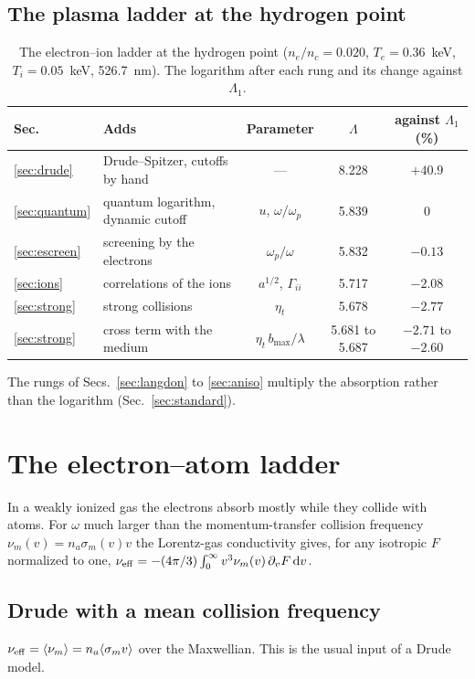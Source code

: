\documentclass[11pt]{article}
\numberwithin{equation}{section}
\newcommand{\dd}{\mathrm d}
\newcommand{\nueff}{\nu_{\rm eff}}
\begin{document}
\subsection{The plasma ladder at the hydrogen point}
\label{sec:hpoint}

\begin{table}[ht]
\caption{The electron--ion ladder at the hydrogen point ($n_e/n_c=0.020$, $T_e=0.36$~keV,
$T_i=0.05$~keV, 526.7~nm). The logarithm after each rung and its change against $\Lambda_1$.}
\label{tab:plasma}
\begin{center}
\begin{tabular}{lL{4.6cm}ccc}
\toprule
Sec. & Adds & Parameter & $\Lambda$ & against $\Lambda_1$ (\%)\\
\midrule
\ref*{sec:drude} & Drude--Spitzer, cutoffs by hand & --- & 8.228 & $+40.9$\\
\ref*{sec:quantum} & quantum logarithm, dynamic cutoff & $u$, $\omega/\omega_p$ & 5.839 & 0\\
\ref*{sec:escreen} & screening by the electrons & $\omega_p/\omega$ & 5.832 & $-0.13$\\
\ref*{sec:ions} & correlations of the ions & $a^{1/2}$, $\Gamma_{ii}$ & 5.717 & $-2.08$\\
\ref*{sec:strong} & strong collisions & $\eta_t$ & 5.678 & $-2.77$\\
\ref*{sec:strong} & cross term with the medium & $\eta_t\,b_{\max}/\lambda$ & 5.681 to 5.687 & $-2.71$ to $-2.60$\\
\bottomrule
\end{tabular}
\end{center}
\end{table}

The rungs of Secs.~\ref{sec:langdon} to \ref{sec:aniso} multiply the absorption rather than the logarithm (Sec.~\ref{sec:standard}).

\section{The electron--atom ladder}
\label{sec:gas}

In a weakly ionized gas the electrons absorb mostly while they collide with atoms. For
$\omega$ much larger than the momentum-transfer collision frequency $\nu_m(v)=n_a\sigma_m(v)v$
the Lorentz-gas conductivity gives, for any isotropic $F$ normalized to one,
$\nueff=-(4\pi/3)\int_0^\infty v^3\nu_m(v)\,\partial_vF\,\dd v$.

\subsection{Drude with a mean collision frequency}
\label{sec:meannu}
$\nueff=\langle\nu_m\rangle=n_a\langle\sigma_mv\rangle$ over the Maxwellian. This is the
usual input of a Drude model.
\end{document}
